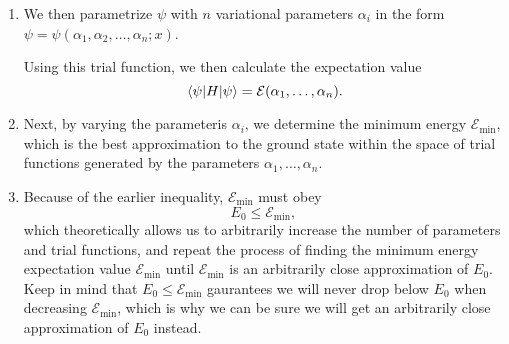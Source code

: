\documentclass[11pt, a4paper]{article}
\begin{document}
\begin{itemize}
\begin{enumerate}
        \item We then parametrize $ \psi $ with $ n $ variational parameters $ \alpha_{i} $ in the form $ \psi = \psi(\alpha_{1}, \alpha_{2}, \ldots, \alpha_{n}; x) $. 

        Using this trial function, we then calculate the expectation value 
        \begin{equation*}
            \mel{\psi}{H}{\psi} = \mathcal{E}(\alpha_{1}, \ldots, \alpha_{n}).
        \end{equation*}

        \item Next, by varying the parameteris $ \alpha_{i} $, we determine the minimum energy $ \mathcal{E}_{\text{min}} $, which is the best approximation to the ground state within the space of trial functions generated by the parameters $ \alpha_{1}, \ldots, \alpha_{n} $. 
        
        \item Because of the earlier inequality, $ \mathcal{E}_{\text{min}} $ must obey
        \begin{equation*}
            E_{0} \leq \mathcal{E}_{\text{min}},
        \end{equation*}
        which theoretically allows us to arbitrarily increase the number of parameters and trial functions, and repeat the process of finding the minimum energy expectation value $ \mathcal{E}_{\text{min}} $ until $ \mathcal{E}_{\text{min}} $ is an arbitrarily close approximation of $ E_{0} $. Keep in mind that $ E_{0} \leq \mathcal{E}_{\text{min}} $ gaurantees we will never drop below $ E_{0} $ when decreasing $ \mathcal{E}_{\text{min}} $, which is why we can be sure we will get an arbitrarily close approximation of $ E_{0} $ instead.
    \end{enumerate}
    

\end{itemize}
\end{document}
